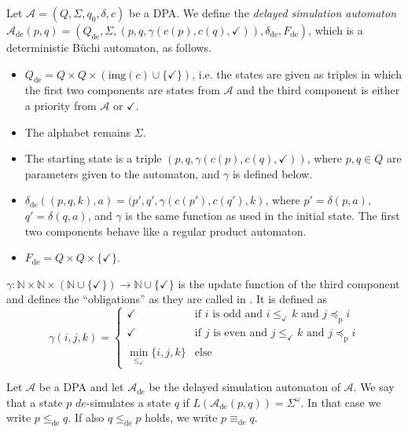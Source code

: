 \begin{defn}
	Let $\mathcal{A} = (Q, \Sigma, q_0, \delta, c)$ be a DPA. We define the \emph{delayed simulation automaton} $\mathcal{A}_\text{de}(p, q) = (Q_\text{de}, \Sigma, (p, q, \gamma(c(p), c(q), \checkmark)), \delta_\text{de}, F_\text{de})$, which is a deterministic Büchi automaton, as follows.
	
	\begin{itemize}
		\item $Q_\text{de} = Q \times Q \times (\text{img}(c) \cup \{ \checkmark \})$, i.e. the states are given as triples in which the first two components are states from $\mathcal{A}$ and the third component is either a priority from $\mathcal{A}$ or $\checkmark$.
		\item The alphabet remains $\Sigma$.
		\item The starting state is a triple $(p, q, \gamma(c(p), c(q), \checkmark))$, where $p, q \in Q$ are parameters given to the automaton, and $\gamma$ is defined below.
		\item $\delta_\text{de}( (p, q, k), a ) = ( p', q', \gamma(c(p'), c(q'), k)$, where $p' = \delta(p, a)$, $q' = \delta(q, a)$, and $\gamma$ is the same function as used in the initial state. The first two components behave like a regular product automaton.
		\item $F_\text{de} = Q \times Q \times \{ \checkmark \}$.
	\end{itemize}
	
	$\gamma : \mathbb{N} \times \mathbb{N} \times (\mathbb{N} \cup \{\checkmark\}) \rightarrow \mathbb{N} \cup \{\checkmark\}$ is the update function of the third component and defines the \enquote{obligations} as they are called in \cite{}. It is defined as 
	$$ \gamma(i, j, k) = \begin{cases}
		\checkmark & \text{if } i \text{ is odd and } i \leq_\checkmark k \text{ and } j \preceq_\text{p} i \\
		\checkmark & \text{if } j \text{ is even and } j \leq_\checkmark k \text{ and } j \preceq_\text{p} i \\
		\min_{\leq_\checkmark} \{ i,j,k \} & \text{else}
	\end{cases} $$
\end{defn}


\begin{defn}
	Let $\mathcal{A}$ be a DPA and let $\mathcal{A}_\text{de}$ be the delayed simulation automaton of $\mathcal{A}$. We say that a state $p$ $de$-simulates a state $q$ if $L(\mathcal{A}_\text{de}(p, q)) = \Sigma^\omega$. In that case we write $p \leq_\text{de} q$. If also $q \leq_\text{de} p$ holds, we write $p \equiv_\text{de} q$.
\end{defn}



